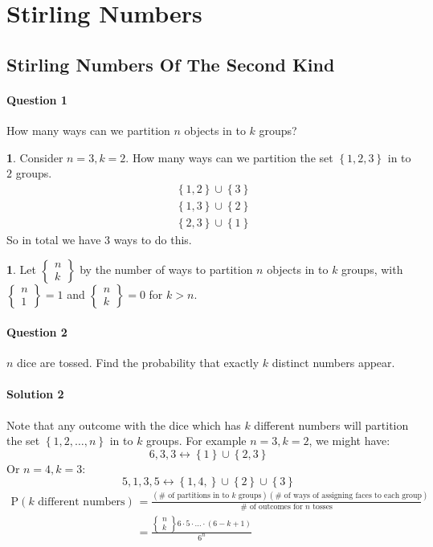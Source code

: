\documentclass[english,12pt]{article}
\theoremstyle{plain}
\theoremstyle{definition}
\newtheorem*{definition}{\protect\definitionname}
\newtheorem*{example}{\protect\examplename}
\theoremstyle{definition} %
\newcommand{\defn}[1]{\begin{definition} #1 \end{definition} }
\newcommand{\eg}[1]{\begin{example} #1 \end{example} }
\providecommand{\definitionname}{Definition}
\providecommand{\examplename}{Example}
\begin{document}
\section{Stirling Numbers}
\subsection{Stirling Numbers Of The Second Kind}
\paragraph{Question 1}
How many ways can we partition $n$ objects in to $k$ groups?
\eg{
Consider $n=3,k=2$.  How many ways can we partition the set $\left\{1,2,3\right\}$ in to $2$ groups.
\begin{align*}
&\left\{1,2\right\}\cup\left\{3\right\}\\
&\left\{1,3\right\}\cup\left\{2\right\}\\
&\left\{2,3\right\}\cup\left\{1\right\}
\end{align*}
So in total we have $3$ ways to do this.
}

\defn{
Let $\begin{Bmatrix}
n\\
k
\end{Bmatrix}$ by the number of ways to partition $n$ objects in to $k$ groups, with $\begin{Bmatrix}
n\\
1
\end{Bmatrix}
=1$ and 
$\begin{Bmatrix}
n\\
k
\end{Bmatrix}
=0$ for $k>n$.
}

\paragraph{Question 2}
$n$ dice are tossed.  Find the probability that exactly $k$ distinct numbers appear.

\paragraph{Solution 2}
Note that any outcome with the dice which has $k$ different numbers will partition the set $\left\{1,2,\ldots,n\right\}$ in to $k$ groups.  For example $n=3,k=2$, we might have:
\[6,3,3\leftrightarrow\left\{1\right\}\cup\left\{2,3\right\}\]
Or $n=4,k=3$:
\[5,1,3,5\leftrightarrow \left\{1,4,\right\}\cup\left\{2\right\}\cup\left\{3\right\}\]
\begin{align*}
\text{P}(k\text{ different numbers})&=\frac{(\#\text{ of partitions in to }k \text{ groups})(\#\text{ of ways of assigning faces to each group})}{\#\text{ of outcomes for }n\text{ tosses}}\\
&=\frac{\begin{Bmatrix}n\\ k\end{Bmatrix}6\cdot 5\cdot\ldots\cdot(6-k+1)}{6^n}
\end{align*}
\end{document}
